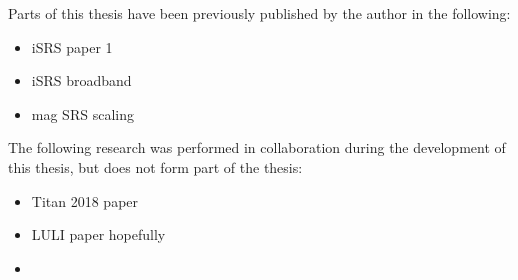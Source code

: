 
\begin{thesisdeclaration}


\noindent Parts of this thesis have been previously published by the author in the following:
\begin{singlespacing}
\begin{itemize}
    \item iSRS paper 1
    \item iSRS broadband
    \item mag SRS scaling
\end{itemize}{}
\end{singlespacing}

\noindent The following research was performed in collaboration during the development of this thesis, but does not form part of the thesis:
\begin{singlespacing}
\begin{itemize}
    \item Titan 2018 paper
    \item LULI paper hopefully
    \item {}

\end{itemize}
\end{singlespacing}
\end{thesisdeclaration}
